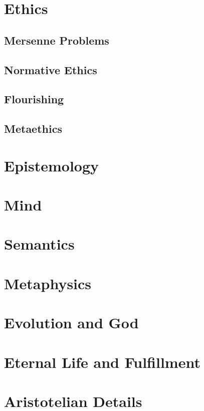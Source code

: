 \def\mychapter{II}

\chapter{Ethics}\label{ch:ethics}
\section{Mersenne Problems}
\section{Normative Ethics}
\section{Flourishing}
\section{Metaethics}
\chaptertail 

\def\mychapter{III}

\chapter{Epistemology}\label{ch:epistemology}
\chaptertail 

\def\mychapter{IV}

\chapter{Mind}\label{ch:mind}
\chaptertail 

\def\mychapter{V}

\chapter{Semantics}\label{ch:semantics}
\chaptertail

\def\mychapter{VI}

\chapter{Metaphysics}\label{ch:metaphysics}
\chaptertail 

\def\mychapter{VII}

\chapter{Evolution and God}\label{ch:God}
\chaptertail

\def\mychapter{VIII}

\chapter{Eternal Life and Fulfillment}\label{ch:eternal-life}
\chaptertail

\def\mychapter{IX}

\chapter{Aristotelian Details}\label{ch:details}
\chaptertail

